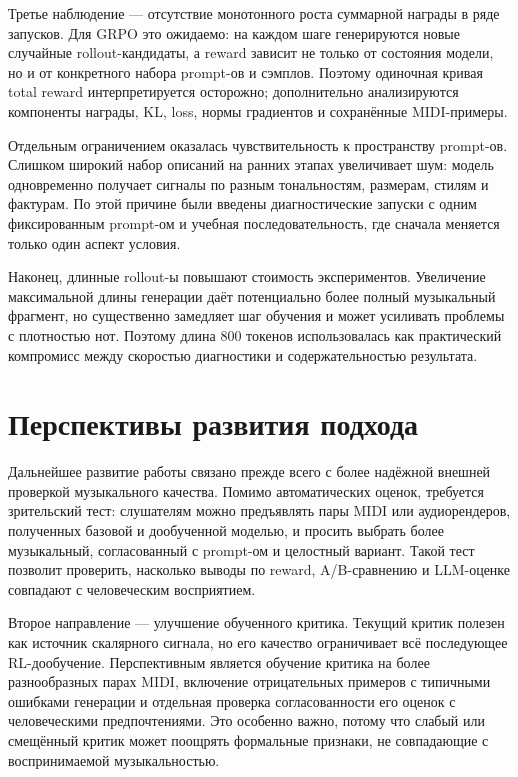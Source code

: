 \documentclass[a4paper,12pt]{extarticle}
\begin{document}
Третье наблюдение --- отсутствие монотонного роста суммарной награды в ряде
запусков. Для GRPO это ожидаемо: на каждом шаге генерируются новые случайные
rollout-кандидаты, а reward зависит не только от состояния модели, но и от
конкретного набора prompt-ов и сэмплов. Поэтому одиночная кривая total reward
интерпретируется осторожно; дополнительно анализируются компоненты награды,
KL, loss, нормы градиентов и сохранённые MIDI-примеры.

Отдельным ограничением оказалась чувствительность к пространству prompt-ов.
Слишком широкий набор описаний на ранних этапах увеличивает шум: модель
одновременно получает сигналы по разным тональностям, размерам, стилям и
фактурам. По этой причине были введены диагностические запуски с одним
фиксированным prompt-ом и учебная последовательность, где сначала меняется
только один аспект условия.

Наконец, длинные rollout-ы повышают стоимость экспериментов. Увеличение
максимальной длины генерации даёт потенциально более полный музыкальный
фрагмент, но существенно замедляет шаг обучения и может усиливать проблемы с
плотностью нот. Поэтому длина 800 токенов использовалась как практический
компромисс между скоростью диагностики и содержательностью результата.

\section{Перспективы развития подхода}

Дальнейшее развитие работы связано прежде всего с более надёжной внешней
проверкой музыкального качества. Помимо автоматических оценок, требуется
зрительский тест: слушателям можно предъявлять пары MIDI или аудиорендеров,
полученных базовой и дообученной моделью, и просить выбрать более музыкальный,
согласованный с prompt-ом и целостный вариант. Такой тест позволит проверить,
насколько выводы по reward, A/B-сравнению и LLM-оценке совпадают с
человеческим восприятием.

Второе направление --- улучшение обученного критика. Текущий критик полезен
как источник скалярного сигнала, но его качество ограничивает всё последующее
RL-дообучение. Перспективным является обучение критика на более разнообразных
парах MIDI, включение отрицательных примеров с типичными ошибками генерации и
отдельная проверка согласованности его оценок с человеческими предпочтениями.
Это особенно важно, потому что слабый или смещённый критик может поощрять
формальные признаки, не совпадающие с воспринимаемой музыкальностью.
\end{document}
